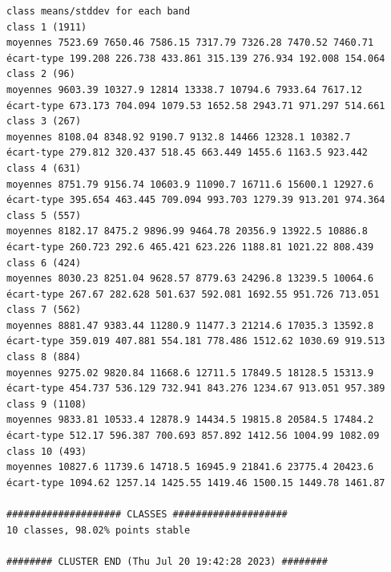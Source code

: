 \documentclass[land,article,submit,pdftex,moreauthors]{Definitions/mdpi}
\begin{document}
\begin{scriptsize}
\begin{verbatim}
class means/stddev for each band
class 1 (1911)
moyennes 7523.69 7650.46 7586.15 7317.79 7326.28 7470.52 7460.71
écart-type 199.208 226.738 433.861 315.139 276.934 192.008 154.064
class 2 (96)
moyennes 9603.39 10327.9 12814 13338.7 10794.6 7933.64 7617.12
écart-type 673.173 704.094 1079.53 1652.58 2943.71 971.297 514.661
class 3 (267)
moyennes 8108.04 8348.92 9190.7 9132.8 14466 12328.1 10382.7
écart-type 279.812 320.437 518.45 663.449 1455.6 1163.5 923.442
class 4 (631)
moyennes 8751.79 9156.74 10603.9 11090.7 16711.6 15600.1 12927.6
écart-type 395.654 463.445 709.094 993.703 1279.39 913.201 974.364
class 5 (557)
moyennes 8182.17 8475.2 9896.99 9464.78 20356.9 13922.5 10886.8
écart-type 260.723 292.6 465.421 623.226 1188.81 1021.22 808.439
class 6 (424)
moyennes 8030.23 8251.04 9628.57 8779.63 24296.8 13239.5 10064.6
écart-type 267.67 282.628 501.637 592.081 1692.55 951.726 713.051
class 7 (562)
moyennes 8881.47 9383.44 11280.9 11477.3 21214.6 17035.3 13592.8
écart-type 359.019 407.881 554.181 778.486 1512.62 1030.69 919.513
class 8 (884)
moyennes 9275.02 9820.84 11668.6 12711.5 17849.5 18128.5 15313.9
écart-type 454.737 536.129 732.941 843.276 1234.67 913.051 957.389
class 9 (1108)
moyennes 9833.81 10533.4 12878.9 14434.5 19815.8 20584.5 17484.2
écart-type 512.17 596.387 700.693 857.892 1412.56 1004.99 1082.09
class 10 (493)
moyennes 10827.6 11739.6 14718.5 16945.9 21841.6 23775.4 20423.6
écart-type 1094.62 1257.14 1425.55 1419.46 1500.15 1449.78 1461.87

#################### CLASSES ####################
10 classes, 98.02% points stable

######## CLUSTER END (Thu Jul 20 19:42:28 2023) ########
\end{verbatim}
\end{scriptsize}
\end{document}
